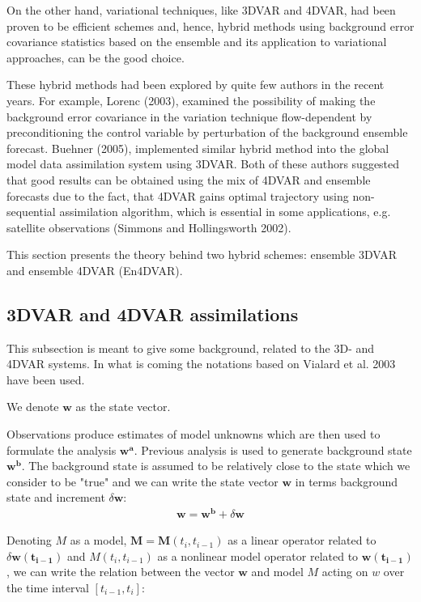 \documentclass[a4,12pt]{article}
\numberwithin{equation}{section}
\begin{document}
On the other hand, variational techniques, like 3DVAR and 4DVAR, had been proven to be efficient schemes and, hence, hybrid methods using background error covariance statistics based on the ensemble and its application to variational approaches, can be the good choice.

These hybrid methods had been explored by quite few authors in the recent years. For example, Lorenc (2003), examined the possibility of making the background error covariance in the variation technique flow-dependent by preconditioning the control variable by perturbation of the background ensemble forecast.  Buehner (2005), implemented similar hybrid method into the global model data assimilation system using 3DVAR. Both of these authors suggested that good results can be obtained using the mix of 4DVAR and ensemble forecasts due to the fact, that 4DVAR gains optimal trajectory using non-sequential assimilation algorithm, which is essential in some applications, e.g. satellite observations (Simmons and
Hollingsworth 2002). 

This section presents the theory behind two hybrid schemes: ensemble 3DVAR and ensemble 4DVAR (En4DVAR). 

\subsection{3DVAR and 4DVAR assimilations}
This subsection is meant to give some background,  related to the 3D- and 4DVAR systems. In what is coming the notations based on Vialard et al. 2003 have been used.

We denote $\mathbf{w}$ as the state vector. 

Observations produce estimates of model unknowns which are then used to formulate the analysis $\mathbf{w^{a}}$. Previous analysis is used to generate background state $\mathbf{w^b}$. The background state is assumed to be relatively close to the state which we consider to be "true" and we can write the state vector $\mathbf {w}$ in terms background state and increment $\delta \mathbf {w}$:
\begin{align}
\mathbf{w} = \mathbf {w^{b}}+\delta \mathbf {w}
\end{align} 

Denoting $M$ as a model, $\mathbf {M} = \mathbf {M}(t_{i}, t_{i-1})$ as a linear operator related to $\delta \mathbf {w(t_{i-1})}$ and $M(t_{i},t_{i-1})$ as a nonlinear model operator related to $\mathbf {w(t_{i-1})}$, we can write the relation between the vector $\mathbf {w}$ and model $M$ acting on $w$ over the time interval $[t_{i-1},t_{i}]$:
\end{document}
